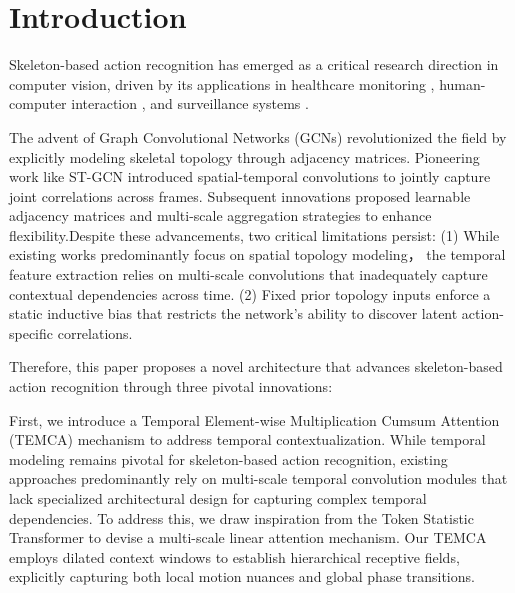 \section{Introduction}

Skeleton-based action recognition has emerged as a critical research 
direction in computer vision, driven by its applications in healthcare 
monitoring \cite{ntu}, human-computer interaction \cite{ntu120}, and surveillance systems \cite{ref3}.



The advent of Graph Convolutional Networks (GCNs) \cite{ref8} revolutionized the field by 
explicitly modeling skeletal topology through adjacency matrices. Pioneering 
work like ST-GCN \cite{ref7} introduced spatial-temporal convolutions to jointly 
capture joint correlations across frames. Subsequent innovations proposed 
learnable adjacency matrices \cite{ref9,ref10} and multi-scale aggregation 
strategies \cite{multiscale} to enhance flexibility.Despite these advancements, 
two critical limitations persist: (1) While existing works predominantly focus on spatial topology modeling，
the temporal feature extraction relies on multi-scale convolutions 
that inadequately capture contextual dependencies across time. (2) Fixed prior topology inputs
enforce a static inductive bias that restricts the network's ability to discover latent action-specific correlations.


Therefore, this paper proposes a novel architecture that advances skeleton-based action recognition through three pivotal innovations:


First, we introduce a Temporal Element-wise Multiplication Cumsum 
Attention (TEMCA) mechanism to address temporal contextualization. 
While temporal modeling remains pivotal for skeleton-based action 
recognition, existing approaches predominantly rely on multi-scale temporal convolution modules \cite{ref9,ref10,ref11,ref12} that lack specialized architectural design for capturing complex temporal dependencies. To address this, we draw inspiration from the Token Statistic Transformer \cite{tost} to devise a multi-scale linear attention mechanism. Our TEMCA employs dilated context windows to 
establish hierarchical receptive fields, explicitly capturing both 
local motion nuances and global phase transitions. 

